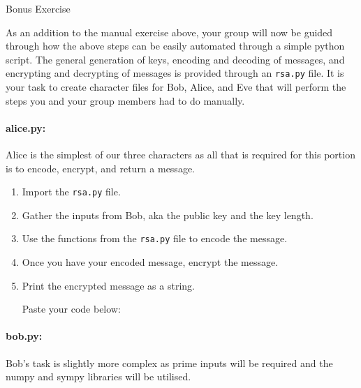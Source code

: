 \documentclass{article}
\begin{document}
    \newpage
    \huge Bonus Exercise
    \normalsize

    As an addition to the manual exercise above, your group will now be guided through how the above steps can be easily automated through a simple python script. The general generation of keys, encoding and decoding of messages, and encrypting and decrypting of messages is provided through an \verb|rsa.py| file. It is your task to create character files for Bob, Alice, and Eve that will perform the steps you and your group members had to do manually.

    \paragraph{alice.py:} Alice is the simplest of our three characters as all that is required for this portion is to encode, encrypt, and return a message.

    \begin{enumerate}
        \item Import the \verb|rsa.py| file.

        \item Gather the inputs from Bob, aka the public key and the key length.
            
        \item Use the functions from the \verb|rsa.py| file to encode the message.

        \item Once you have your encoded message, encrypt the message.

        \item Print the encrypted message as a string.

            Paste your code below:

            \TextField[width=6in,height=5in, bordercolor=0 0 0, name=bob, multiline=true]{}

    \end{enumerate}

    \paragraph{bob.py:} Bob’s task is slightly more complex as prime inputs will be required and the numpy and sympy libraries will be utilised.
\end{document}

